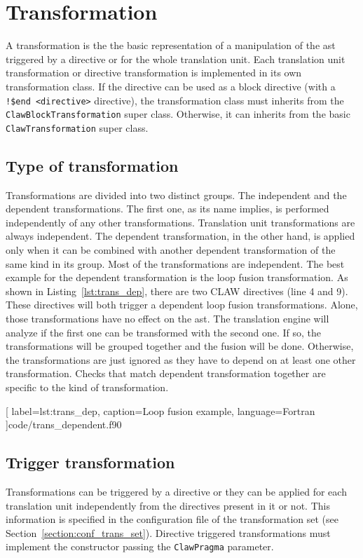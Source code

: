\chapter{Transformation}
\label{chapter:transformation}
A transformation is the the basic representation of a manipulation of the
\gls{ast} triggered by a directive or for the whole translation unit. Each 
translation unit transformation or directive transformation is implemented in
its own transformation class. If the directive can be used as a block directive 
(with a \lstinline|!$end <directive>| directive), the transformation class must 
inherits from the \lstinline!ClawBlockTransformation! super class. Otherwise, 
it can inherits from the basic \lstinline!ClawTransformation! super class.

\section{Type of transformation}
\label{section:trans_type}
Transformations are divided into two distinct groups. The independent and the
dependent transformations. The first one, as its name implies, is performed
independently of any other transformations. Translation unit transformations 
are always independent. 
The dependent transformation, in the
other hand, is applied only when it can be combined with another dependent
transformation of the same kind in its group. Most of the transformations are
independent. The best example for the dependent transformation is the loop
fusion transformation. As shown in Listing~\ref{lst:trans_dep}, there are two
CLAW directives (line 4 and 9). These directives will both trigger a dependent 
loop fusion transformations. Alone, those transformations have no effect
on the \gls{ast}. The translation engine will analyze if the
first one can be transformed with the second one. If so, the transformations 
will be grouped together and the fusion will be done. Otherwise, the 
transformations are just ignored as they have to depend on at least one other 
transformation. Checks that match dependent transformation together are 
specific to the kind of transformation.


  [
    label=lst:trans_dep,
    caption=Loop fusion example,
    language=Fortran
  ]{code/trans_dependent.f90}

\section{Trigger transformation}
\label{section:trans_trigger}
Transformations can be triggered by a directive or they can be applied for each
translation unit independently from the directives present in it or not.
This information is specified in the configuration file of the transformation
set (see Section~\ref{section:conf_trans_set}). Directive triggered 
transformations must implement the constructor passing the 
\lstinline|ClawPragma| parameter.


